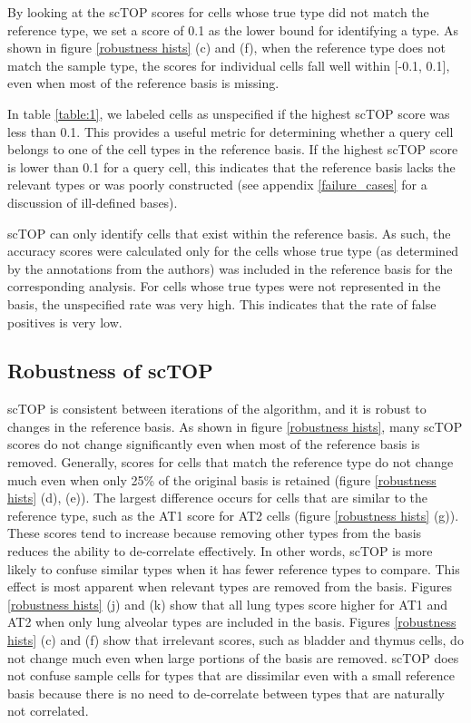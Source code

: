\documentclass[aps,superscriptaddress, notitlepage,longbibliography]{revtex4-1}
\begin{document}
By looking at the scTOP scores for cells whose true type did not match the reference type, we set a score of 0.1 as the lower bound for identifying a type. As shown in figure \ref{robustness hists} (c) and (f), when the reference type does not match the sample type, the scores for individual cells fall well within [-0.1, 0.1], even when most of the reference basis is missing.

In table \ref{table:1}, we labeled cells as unspecified if the highest scTOP score was less than 0.1. This provides a useful metric for determining whether a query cell belongs to one of the cell types in the reference basis. If the highest scTOP score is lower than 0.1 for a query cell, this indicates that the reference basis lacks the relevant types or was poorly constructed (see appendix \ref{failure_cases} for a discussion of ill-defined bases). 

scTOP can only identify cells that exist within the reference basis. As such, the accuracy scores were calculated only for the cells whose true type (as determined by the annotations from the authors) was included in the reference basis for the corresponding analysis. For cells whose true types were not represented in the basis, the unspecified rate was very high. This indicates that the rate of false positives is very low.

\subsection{Robustness of scTOP}
scTOP is consistent between iterations of the algorithm, and it is robust to changes in the reference basis. As shown in figure \ref{robustness hists}, many scTOP scores do not change significantly even when most of the reference basis is removed. Generally, scores for cells that match the reference type do not change much even when only 25\% of the original basis is retained (figure \ref{robustness hists} (d), (e)). The largest difference occurs for cells that are similar to the reference type, such as the AT1 score for AT2 cells (figure \ref{robustness hists} (g)). These scores tend to increase because removing other types from the basis reduces the ability to de-correlate effectively. In other words, scTOP is more likely to confuse similar types when it has fewer reference types to compare. This effect is most apparent when relevant types are removed from the basis. Figures \ref{robustness hists} (j) and (k) show that all lung types score higher for AT1 and AT2 when only lung alveolar types are included in the basis. Figures \ref{robustness hists} (c) and (f) show that irrelevant scores, such as bladder and thymus cells, do not change much even when large portions of the basis are removed. scTOP does not confuse sample cells for types that are dissimilar even with a small reference basis because there is no need to de-correlate between types that are naturally not correlated.
\end{document}
